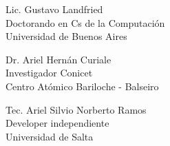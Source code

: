 \documentclass[a4paper,11pt]{article}
\begin{document}
\begin{paracol}{3}

  \scriptsize


\noindent  Lic. Gustavo Landfried \\
Doctorando en Cs de la Computación \\
Universidad de Buenos Aires



 \switchcolumn

\noindent  Dr. Ariel Hernán Curiale \\
Investigador Conicet \\
Centro Atómico Bariloche - Balseiro

 \switchcolumn

\noindent Tec. Ariel Silvio Norberto Ramos\\
Developer independiente \\
Universidad de Salta

 \end{paracol}

%
%
%
%
%
%
%
%
%
%
\end{document}
